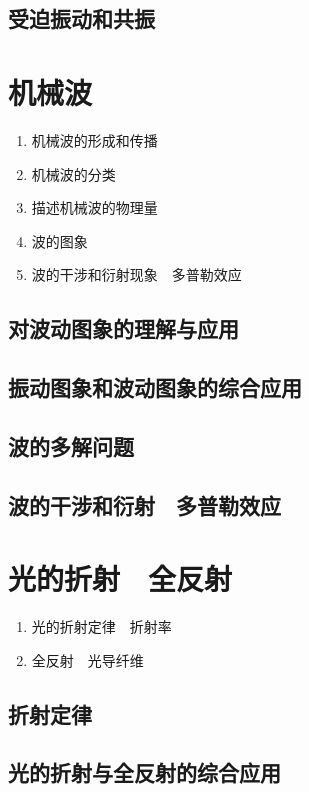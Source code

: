 \documentclass[cn,11pt, simple]{elegantbook}
\begin{document}
\clearpage\section{受迫振动和共振}

\chapter{机械波}
\begin{enumerate}
   \item 机械波的形成和传播
   \item 机械波的分类
   \item 描述机械波的物理量
   \item 波的图象
   \item 波的干涉和衍射现象　多普勒效应
\end{enumerate}

\clearpage\section{对波动图象的理解与应用}

\clearpage\section{振动图象和波动图象的综合应用}

\clearpage\section{波的多解问题}

\clearpage\section{波的干涉和衍射　多普勒效应}

\chapter{光的折射　全反射}
\begin{enumerate}
   \item 光的折射定律　折射率
   \item 全反射　光导纤维
\end{enumerate}

\clearpage\section{折射定律}

\clearpage\section{光的折射与全反射的综合应用}
\end{document}
